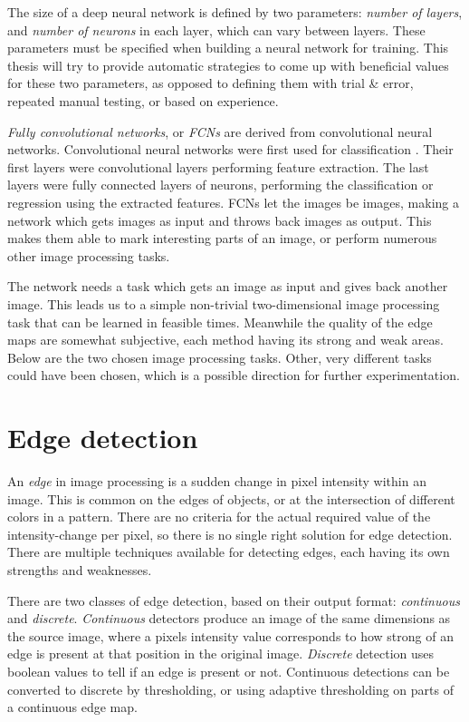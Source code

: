 \documentclass[12pt]{report}
\begin{document}
The size of a deep neural network is defined by two parameters: \textit{number of layers}, and \textit{number of neurons} in each layer, which can vary between layers. These parameters must be specified when building a neural network for training. This thesis will try to provide automatic strategies to come up with beneficial values for these two parameters, as opposed to defining them with trial \& error, repeated manual testing, or based on experience.

\textit{Fully convolutional networks}, or \textit{FCNs} are derived from convolutional neural networks. Convolutional neural networks were first used for classification \cite{applications}. Their first layers were convolutional layers performing feature extraction. The last layers were fully connected layers of neurons, performing the classification or regression using the extracted features. FCNs let the images be images, making a network which gets images as input and throws back images as output. This makes them able to mark interesting parts of an image, or perform numerous other image processing tasks.

The network needs a task which gets an image as input and gives back another image. This leads us to a simple non-trivial two-dimensional image processing task that can be learned in feasible times. Meanwhile the quality of the edge maps are somewhat subjective, each method having its strong and weak areas. Below are the two chosen image processing tasks. Other, very different tasks could have been chosen, which is a possible direction for further experimentation.
\section{Edge detection}
An \textit{edge} in image processing is a sudden change in pixel intensity within an image. This is common on the edges of objects, or at the intersection of different colors in a pattern. There are no criteria for the actual required value of the intensity-change per pixel, so there is no single right solution for edge detection. There are multiple techniques available for detecting edges, each having its own strengths and weaknesses.

There are two classes of edge detection, based on their output format: \textit{continuous} and \textit{discrete}. \textit{Continuous} detectors produce an image of the same dimensions as the source image, where a pixels intensity value corresponds to how strong of an edge is present at that position in the original image. \textit{Discrete} detection uses boolean values to tell if an edge is present or not. Continuous detections can be converted to discrete by thresholding, or using adaptive thresholding on parts of a continuous edge map.
\end{document}
